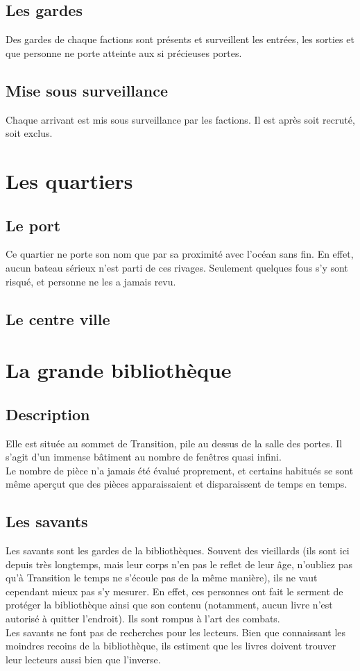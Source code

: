 \documentclass{book}
\begin{document}
\subsection{Les gardes}
Des gardes de chaque factions sont présents et surveillent les entrées, les sorties et que personne ne porte atteinte aux si précieuses portes.

\subsection{Mise sous surveillance}
Chaque arrivant est mis sous surveillance par les factions. Il est après soit recruté, soit exclus.

\section{Les quartiers}
\subsection{Le port}
Ce quartier ne porte son nom que par sa proximité avec l'océan sans fin.
En effet, aucun bateau sérieux n'est parti de ces rivages. Seulement quelques fous s'y sont risqué, et personne ne les a jamais revu.

\subsection{Le centre ville}

\section{La grande bibliothèque}
\subsection{Description}
Elle est située au sommet de Transition, pile au dessus de la salle des portes. Il s'agit d'un immense bâtiment au nombre de fenêtres quasi infini.\\
Le nombre de pièce n'a jamais été évalué proprement, et certains habitués se sont même aperçut que des pièces apparaissaient et disparaissent de temps en temps.
\subsection{Les savants}
Les savants sont les gardes de la bibliothèques. Souvent des vieillards (ils sont ici depuis très longtemps, mais leur corps n'en pas le reflet de leur âge, n'oubliez pas qu'à Transition le temps ne s'écoule pas de la même manière), ils ne vaut cependant mieux pas s'y mesurer. En effet, ces personnes ont fait le serment de protéger la bibliothèque ainsi que son contenu (notamment, aucun livre n'est autorisé à quitter l'endroit). Ils sont rompus à l'art des combats.
\\
Les savants ne font pas de recherches pour les lecteurs. Bien que connaissant les moindres recoins de la bibliothèque, ils estiment que les livres doivent trouver leur lecteurs aussi bien que l'inverse.
\end{document}
